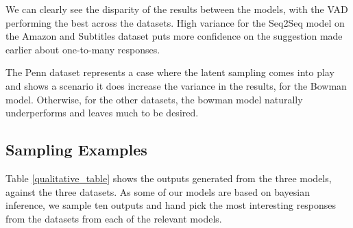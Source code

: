 \documentclass[12pt,twoside]{report}
\begin{document}
We can clearly see the disparity of the results between the models, with the VAD performing the best across the datasets. High variance for the Seq2Seq model on the Amazon and Subtitles dataset puts more confidence on the suggestion made earlier about one-to-many responses. 

The Penn dataset represents a case where the latent sampling comes into play and shows a scenario it does increase the variance in the results, for the Bowman model. Otherwise, for the other datasets, the bowman model naturally underperforms and leaves much to be desired.

\subsection{Sampling Examples}
\label{sampling_examples}
Table \ref{qualitative_table} shows the outputs generated from the three models, against the three datasets. As some of our models are based on bayesian inference, we sample ten outputs and hand pick the most interesting responses from the datasets from each of the relevant models. 
\end{document}
